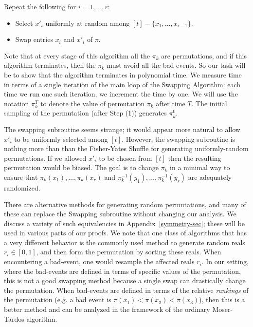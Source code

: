 \smallskip \noindent
Repeat the following for $i = 1, \dots, r$:
\begin{itemize}
\item Select $x'_i$ uniformly at random among $[t] - \{x_1, \dots, x_{i-1} \}$. 
\item Swap entries $x_i$ and $x'_i$ of $\pi$.
\end{itemize}

Note that at every stage of this algorithm all the $\pi_k$ are permutations, and if this algorithm terminates, then the $\pi_k$ must avoid all the bad-events. So our task will be to show that the algorithm terminates in polynomial time.
We measure time in terms of a single iteration of the main loop of the Swapping Algorithm: each time we run one such iteration, we increment the time by one. 
We will use the notation $\pi_k^T$ to denote the value of permutation $\pi_k$ after time $T$. The initial sampling of the permutation (after Step (1)) generates $\pi_k^0$. 

The swapping subroutine seems strange; it would appear more natural to allow $x'_i$ to be uniformly selected among $[t]$. However, the swapping subroutine is nothing more than than the Fisher-Yates Shuffle for generating uniformly-random permutations. If we allowed $x'_i$ to be chosen from $[t]$ then the resulting permutation would be biased. The goal is to change $\pi_k$ in a minimal way to ensure that $\pi_k(x_1), \dots, \pi_k(x_r)$ and $\pi_k^{-1}(y_1), \dots, \pi_k^{-1}(y_r)$ are adequately randomized. 

There are alternative methods for generating random permutations, and many of these can replace the Swapping subroutine without changing our analysis. We discuss a variety of such equivalencies in Appendix~\ref{symmetry-sec}; these will be used in various parts of our proofs. We note that one class of algorithms that has a very different behavior is the commonly used method to generate random reals $r_i \in [0,1]$, and then form the permutation by sorting these reals. When encountering a bad-event, one would resample the affected reals $r_i$. In our setting, where the bad-events are defined in terms of specific values of the permutation, this is not a good swapping method because a single swap can drastically change the permutation. When bad-events are defined in terms of the relative \emph{rankings} of the permutation (e.g. a bad event is $\pi(x_1) < \pi(x_2) < \pi(x_3)$), then this is a better method and can be analyzed in the framework of the ordinary Moser-Tardos algorithm.

